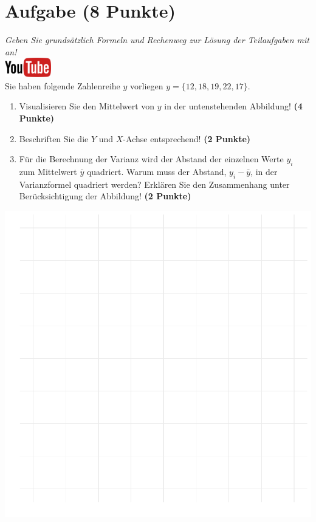 \documentclass[a4paper, 9pt]{scrartcl}\usepackage[]{graphicx}\usepackage[]{xcolor}
\makeatletter
\def\maxwidth{ %
  \ifdim\Gin@nat@width>\linewidth
    \linewidth
  \else
    \Gin@nat@width
  \fi
}
\makeatother
\begin{document}
\section{Aufgabe \hfill (8 Punkte)}

\textit{Geben Sie grunds{\"a}tzlich Formeln und Rechenweg zur L{\"o}sung der
  Teilaufgaben mit an!} \\[1Ex]

\hfill\href{https://youtu.be/oMdtYbDInYE}{\includegraphics[width =
  2cm]{img/youtube}}\\[1Ex]

Sie haben folgende Zahlenreihe $y$ vorliegen
$y = \{12, 18, 19, 22, 17\}$.

\begin{enumerate}
\item Visualisieren Sie den Mittelwert von $y$ in der untenstehenden
  Abbildung! \textbf{(4 Punkte)}
\item Beschriften Sie die $Y$ und $X$-Achse entsprechend! \textbf{(2 Punkte)}
\item F{\"u}r die Berechnung der Varianz wird der Abstand der einzelnen Werte $y_i$
  zum Mittelwert $\bar{y}$ quadriert. Warum muss der Abstand, $y_i -
  \bar{y}$, in der Varianzformel quadriert werden?
  Erkl{\"a}ren Sie den Zusammenhang unter Ber{\"u}cksichtigung der Abbildung!
  \textbf{(2 Punkte)}  
\end{enumerate}



{\centering \includegraphics[width=\maxwidth]{img/desc-01-1} 

}
\end{document}
